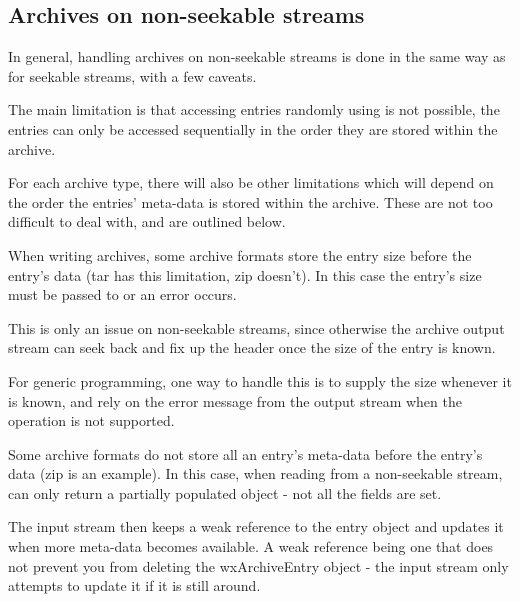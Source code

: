 \subsection{Archives on non-seekable streams}\label{wxarcnoseek}


In general, handling archives on non-seekable streams is done in the same
way as for seekable streams, with a few caveats.

The main limitation is that accessing entries randomly using
is not possible, the entries can only be accessed sequentially in the order 
they are stored within the archive.

For each archive type, there will also be other limitations which will
depend on the order the entries' meta-data is stored within the archive.
These are not too difficult to deal with, and are outlined below.


When writing archives, some archive formats store the entry size before
the entry's data (tar has this limitation, zip doesn't). In this case
the entry's size must be passed to
  or an error
occurs.

This is only an issue on non-seekable streams, since otherwise the archive
output stream can seek back and fix up the header once the size of the
entry is known.

For generic programming, one way to handle this is to supply the size
whenever it is known, and rely on the error message from the output
stream when the operation is not supported.


Some archive formats do not store all an entry's meta-data before the
entry's data (zip is an example). In this case, when reading from a
non-seekable stream,  
can only return a partially populated 
object - not all the fields are set.

The input stream then keeps a weak reference to the entry object and
updates it when more meta-data becomes available. A weak reference being
one that does not prevent you from deleting the wxArchiveEntry object - the
input stream only attempts to update it if it is still around.

